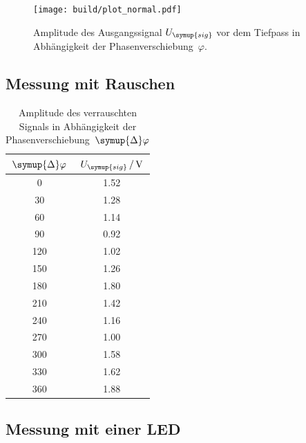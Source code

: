 \begin{figure}
  \centering
  \texttt{[image: build/plot\_normal.pdf]}
  \caption{Amplitude des Ausgangssignal $U_{\symup{sig}}$ vor dem Tiefpass in Abhängigkeit der Phasenverschiebung~$\varphi$.}
  \label{fig:plot normal}
\end{figure}

\subsection{Messung mit Rauschen}
\label{sec:mit rauschen}

\begin{table} [H]
  \centering
  \caption{Amplitude des verrauschten Signals in Abhängigkeit der Phasenverschiebung~$\symup{\Delta}\varphi$}
  \label{tab:verrauscht}
  \begin{tabular}{S[table-format=3.0] S[table-format=1.2]}
    \toprule
    {$\symup{\Delta}\varphi$} & {$U_{\symup{sig}}\,/\,\unit{\volt}$} \\
    	  & 1.52 \\
    30	& 1.28 \\
    60	& 1.14 \\
    90	& 0.92 \\
    120	& 1.02 \\
    150	& 1.26 \\
    180	& 1.80 \\
    210	& 1.42 \\
    240	& 1.16 \\
    270	& 1.00 \\
    300	& 1.58 \\
    330	& 1.62 \\
    360	& 1.88 \\
    \bottomrule
  \end{tabular}
\end{table}

\subsection{Messung mit einer LED}
\label{sec:LED}

